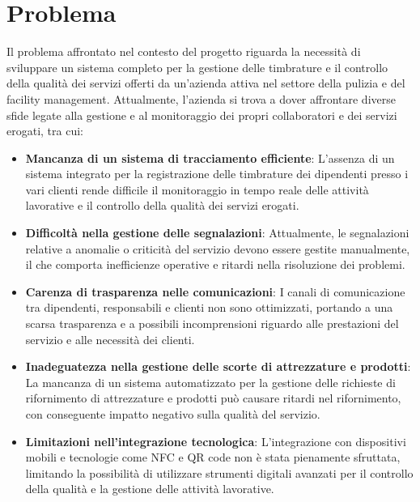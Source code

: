 \documentclass[twoside]{supsistudent}
\begin{document}
\chapter{Problema}
Il problema affrontato nel contesto del progetto riguarda la necessità di sviluppare un sistema completo per la gestione delle timbrature e il controllo della qualità dei servizi offerti da un'azienda attiva nel settore della pulizia e del facility management. Attualmente, l'azienda si trova a dover affrontare diverse sfide legate alla gestione e al monitoraggio dei propri collaboratori e dei servizi erogati, tra cui:

\begin{itemize}
  \item \textbf{Mancanza di un sistema di tracciamento efficiente}: L'assenza di un sistema integrato per la registrazione delle timbrature dei dipendenti presso i vari clienti rende difficile il monitoraggio in tempo reale delle attività lavorative e il controllo della qualità dei servizi erogati.

  \item \textbf{Difficoltà nella gestione delle segnalazioni}: Attualmente, le segnalazioni relative a anomalie o criticità del servizio devono essere gestite manualmente, il che comporta inefficienze operative e ritardi nella risoluzione dei problemi.

  \item \textbf{Carenza di trasparenza nelle comunicazioni}: I canali di comunicazione tra dipendenti, responsabili e clienti non sono ottimizzati, portando a una scarsa trasparenza e a possibili incomprensioni riguardo alle prestazioni del servizio e alle necessità dei clienti.

  \item \textbf{Inadeguatezza nella gestione delle scorte di attrezzature e prodotti}: La mancanza di un sistema automatizzato per la gestione delle richieste di rifornimento di attrezzature e prodotti può causare ritardi nel rifornimento, con conseguente impatto negativo sulla qualità del servizio.

  \item \textbf{Limitazioni nell'integrazione tecnologica}: L'integrazione con dispositivi mobili e tecnologie come NFC e QR code non è stata pienamente sfruttata, limitando la possibilità di utilizzare strumenti digitali avanzati per il controllo della qualità e la gestione delle attività lavorative.

\end{itemize}
\end{document}
